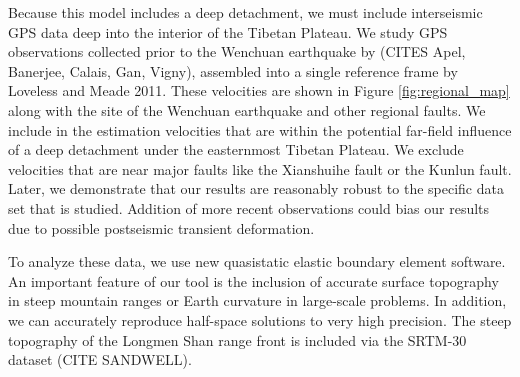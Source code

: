 \documentclass[12pt]{article}
\begin{document}
Because this model includes a deep detachment, we must include interseismic GPS data deep into the interior of the Tibetan Plateau. We study GPS observations collected prior to the Wenchuan earthquake by (CITES Apel, Banerjee, Calais, Gan, Vigny), assembled into a single reference frame by Loveless and Meade 2011. These velocities are shown in Figure \ref{fig:regional_map} along with the site of the Wenchuan earthquake and other regional faults. We include in the estimation velocities that are within the potential far-field influence of a deep detachment under the easternmost Tibetan Plateau. We exclude velocities that are near major faults like the Xianshuihe fault or the Kunlun fault. Later, we demonstrate that our results are reasonably robust to the specific data set that is studied. Addition of more recent observations could bias our results due to possible postseismic transient deformation.

To analyze these data, we use new quasistatic elastic boundary element software. An important feature of our tool is the inclusion of accurate surface topography in steep mountain ranges or Earth curvature in large-scale problems. In addition, we can accurately reproduce half-space solutions to very high precision. The steep topography of the Longmen Shan range front is included via the SRTM-30 dataset (CITE SANDWELL).
\end{document}
